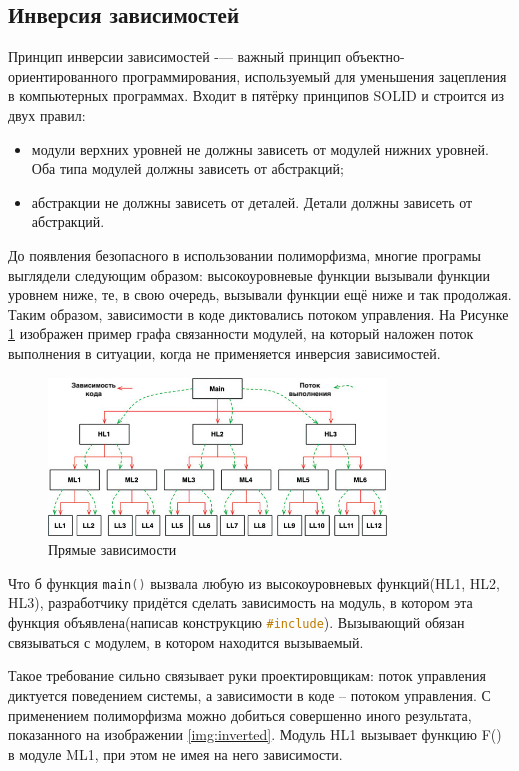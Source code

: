 \subsection{Инверсия зависимостей}

Принцип инверсии зависимостей -— важный принцип объектно-ориентированного программирования, используемый для уменьшения зацепления в компьютерных программах. Входит в пятёрку принципов SOLID и строится из двух правил:
\begin{itemize}
	\item модули верхних уровней не должны зависеть от модулей нижних уровней. Оба типа модулей должны зависеть от абстракций;
	\item абстракции не должны зависеть от деталей. Детали должны зависеть от абстракций.
\end{itemize}

До появления безопасного в использовании полиморфизма, многие програмы выглядели следующим образом: высокоуровневые функции вызывали функции уровнем ниже, те, в свою очередь, вызывали функции ещё ниже и так продолжая. Таким образом, зависимости в коде диктовались потоком управления. На Рисунке \ref{img:direct:dep} изображен пример графа связанности модулей, на который наложен поток выполнения в ситуации, когда не применяется инверсия зависимостей.

\begin{figure}[h]
  \centering
    \includegraphics[width=0.8\textwidth]{inc/img/direct.jpeg}
    \caption{Прямые зависимости}
  \label{img:direct:dep}
\end{figure}

Что б функция \lstinline[language=C]{main()} вызвала любую из высокоуровневых функций(HL1, HL2, HL3), разработчику придётся сделать зависимость на модуль, в котором эта функция объявлена(написав конструкцию \lstinline[language=C]{#include}). Вызывающий обязан связываться с модулем, в котором находится вызываемый.

Такое требование сильно связывает руки проектировщикам: поток управления диктуется поведением системы, а зависимости в коде -- потоком управления. С применением полиморфизма можно добиться совершенно иного результата, показанного на изображении \ref{img:inverted}. Модуль HL1 вызывает функцию F() в модуле ML1, при этом не имея на него зависимости.

